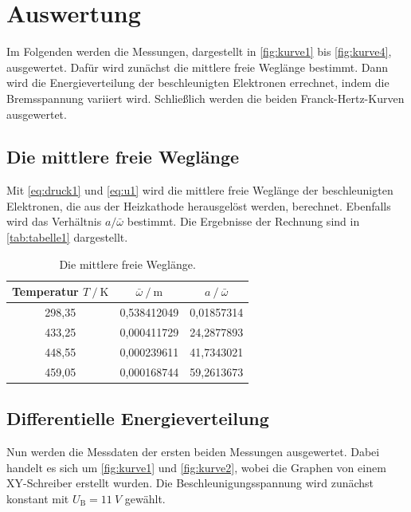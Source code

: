 \section{Auswertung}
\label{sec:Auswertung}

Im Folgenden werden die Messungen, dargestellt in \autoref{fig:kurve1} bis \autoref{fig:kurve4}, ausgewertet.
Dafür wird zunächst die mittlere freie Weglänge bestimmt.
Dann wird die Energieverteilung der beschleunigten Elektronen errechnet, indem die Bremsspannung variiert wird.
Schließlich werden die beiden Franck-Hertz-Kurven ausgewertet.


\subsection{Die mittlere freie Weglänge}
Mit \autoref{eq:druck1} und \autoref{eq:u1} wird die mittlere freie Weglänge der beschleunigten Elektronen,
die aus der Heizkathode herausgelöst werden, berechnet.
Ebenfalls wird das Verhältnis $a / \bar{\omega}$ bestimmt.
Die Ergebnisse der Rechnung sind in \autoref{tab:tabelle1} dargestellt.

\begin{table} [H]
  \centering
  \caption{Die mittlere freie Weglänge.}
  \label{tab:tabelle1}
  \begin{tabular}{c c c}
      \toprule
      Temperatur $T \mathbin{/} \unit\kelvin$ & $\bar{\omega} \mathbin{/} \unit\meter$ & $a \mathbin{/} \bar{\omega}$ \\
      \midrule 
      298,35 & 0,538412049 &  0,01857314\\
      433,25 & 0,000411729 & 24,2877893\\
      448,55 & 0,000239611 & 41,7343021\\
      459,05 & 0,000168744 & 59,2613673\\
      \bottomrule
  \end{tabular}
\end{table}

\subsection{Differentielle Energieverteilung}
Nun werden die Messdaten der ersten beiden Messungen ausgewertet.
Dabei handelt es sich um \autoref{fig:kurve1} und \autoref{fig:kurve2}, wobei die Graphen von einem XY-Schreiber erstellt wurden.
Die Beschleunigungsspannung wird zunächst konstant mit $U_\text{B} = \qty{11}{V}$ gewählt.

